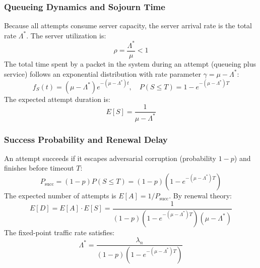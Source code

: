 \documentclass[12pt,onecolumn]{article}
\begin{document}
\subsubsection{Queueing Dynamics and Sojourn Time}
Because all attempts consume server capacity, the server arrival rate is the total rate $\Lambda^*$. The server utilization is:
\begin{equation}
\rho = \frac{\Lambda^*}{\mu} < 1
\end{equation}
The total time spent by a packet in the system during an attempt (queueing plus service) follows an exponential distribution with rate parameter $\gamma = \mu - \Lambda^*$:
\begin{equation}
f_S(t) = (\mu - \Lambda^*) e^{-(\mu - \Lambda^*) t}, \quad P(S \le T) = 1 - e^{-(\mu - \Lambda^*) T}
\end{equation}
The expected attempt duration is:
\begin{equation}
E[S] = \frac{1}{\mu - \Lambda^*}
\end{equation}

\subsubsection{Success Probability and Renewal Delay}
An attempt succeeds if it escapes adversarial corruption (probability $1 - p$) and finishes before timeout $T$:
\begin{equation}
P_{\text{succ}} = (1 - p) P(S \le T) = (1 - p)\left(1 - e^{-(\mu - \Lambda^*) T}\right)
\end{equation}
The expected number of attempts is $E[A] = 1/P_{\text{succ}}$. By renewal theory:
\begin{equation}
E[D] = E[A] \cdot E[S] = \frac{1}{(1 - p)\left(1 - e^{-(\mu - \Lambda^*) T}\right)(\mu - \Lambda^*)}
\end{equation}
The fixed-point traffic rate satisfies:
\begin{equation}
\Lambda^* = \frac{\lambda_n}{(1 - p)\left(1 - e^{-(\mu - \Lambda^*) T}\right)}
\end{equation}
\end{document}
